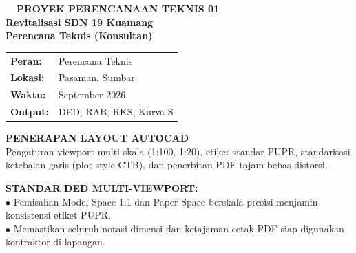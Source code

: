 \documentclass[10pt,a4paper,landscape]{article}
\begin{document}
\noindent
\begin{minipage}[t]{0.30\linewidth}
  \vspace{0pt}
  \begin{tcolorbox}[sharp corners, boxrule=0.8pt, colframe=pborder, colback=white, left=3mm, right=3mm, top=2.5mm, bottom=2.5mm, height=100mm]
    \colorbox{pred}{\fontsize{7pt}{8pt}\selectfont\bfseries\color{white}\ \ PROYEK PERENCANAAN TEKNIS 01\ \ }\\[1.5mm]
    {\fontsize{9.5pt}{11.5pt}\selectfont\bfseries\color{pnavy}Revitalisasi SDN 19 Kuamang}\\[0.5mm]
    {\fontsize{7pt}{8.5pt}\selectfont\bfseries\color{pred}Perencana Teknis (Konsultan)}\\[2mm]

    \begin{tcolorbox}[sharp corners, boxrule=0.5pt, colframe=pborder, colback=pbglight, left=2mm, right=2mm, top=1.5mm, bottom=1.5mm]
      \begin{tabularx}{\linewidth}{@{}p{22mm} X@{}}
        {\fontsize{6.8pt}{8pt}\selectfont\bfseries Peran:} & {\fontsize{6.8pt}{8pt}\selectfont Perencana Teknis} \\[0.8mm]
        {\fontsize{6.8pt}{8pt}\selectfont\bfseries Lokasi:} & {\fontsize{6.8pt}{8pt}\selectfont Pasaman, Sumbar} \\[0.8mm]
        {\fontsize{6.8pt}{8pt}\selectfont\bfseries Waktu:} & {\fontsize{6.8pt}{8pt}\selectfont September 2026} \\[0.8mm]
        {\fontsize{6.8pt}{8pt}\selectfont\bfseries Output:} & {\fontsize{6.8pt}{8pt}\selectfont DED, RAB, RKS, Kurva S}
      \end{tabularx}
    \end{tcolorbox}
    \vspace{1.5mm}

    {\fontsize{7.5pt}{9pt}\selectfont\bfseries\color{pnavy}PENERAPAN LAYOUT AUTOCAD}\\[0.8mm]
    {\fontsize{6.5pt}{8.2pt}\selectfont\color{psteel}
    Pengaturan viewport multi-skala (1:100, 1:20), etiket standar PUPR, standarisasi ketebalan garis (plot style CTB), dan penerbitan PDF tajam bebas distorsi.
    }
  \end{tcolorbox}
  \vspace{2mm}

  \begin{tcolorbox}[sharp corners, boxrule=0.6pt, colframe=pnavy, colback=pbglight, left=2.5mm, right=2.5mm, top=2mm, bottom=2mm, height=52mm]
    {\fontsize{7pt}{8.5pt}\selectfont\bfseries\color{pnavy}STANDAR DED MULTI-VIEWPORT:}\\[1.5mm]
    {\fontsize{6.5pt}{8.2pt}\selectfont\color{psteel}
    $\bullet$ Pemisahan Model Space 1:1 dan Paper Space berskala presisi menjamin konsistensi etiket PUPR.\\
    $\bullet$ Memastikan seluruh notasi dimensi dan ketajaman cetak PDF siap digunakan kontraktor di lapangan.
    }
  \end{tcolorbox}
\end{minipage}%
\end{document}
